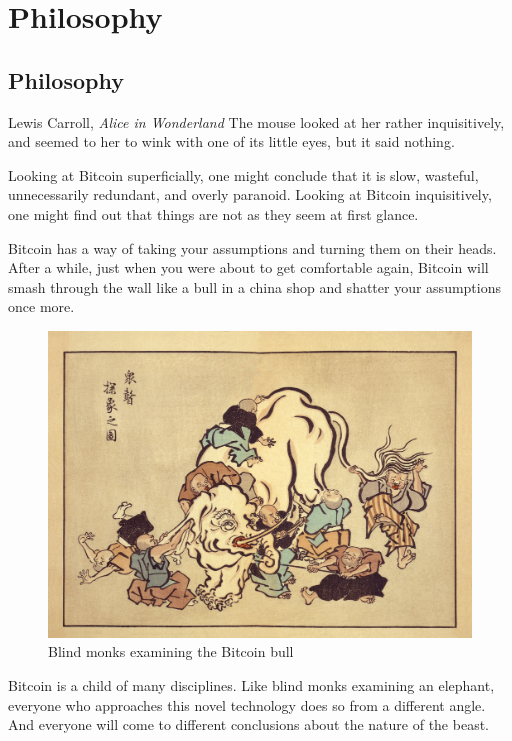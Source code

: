\part{Philosophy}
\label{ch:philosophy}
\chapter*{Philosophy}

\begin{chapquote}{Lewis Carroll, \textit{Alice in Wonderland}}
The mouse looked at her rather inquisitively, and seemed to her to wink with one
of its little eyes, but it said nothing.
\end{chapquote}

Looking at Bitcoin superficially, one might conclude that it is slow, wasteful,
unnecessarily redundant, and overly paranoid. Looking at Bitcoin inquisitively,
one might find out that things are not as they seem at first glance.

Bitcoin has a way of taking your assumptions and turning them on their heads.
After a while, just when you were about to get comfortable again, Bitcoin will
smash through the wall like a bull in a china shop and shatter your assumptions
once more.

\begin{figure}
  \includegraphics{assets/images/blind-monks.jpg}
  \caption{Blind monks examining the Bitcoin bull}
  \label{fig:blind-monks}
\end{figure}

Bitcoin is a child of many disciplines. Like blind monks examining an elephant,
everyone who approaches this novel technology does so from a different angle.
And everyone will come to different conclusions about the nature of the beast.

